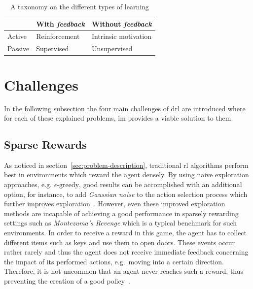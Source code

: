 \documentclass[draft,final]{vutinfth} %
\newcommand{\p}[1]{see p. #1}
\begin{document}
    \begin{table}
        \centering
        \begin{tabular}{|l|l|l|}
            \hline
            & With \textit{feedback} & Without \textit{feedback} \\
            \hline
            Active  & Reinforcement          & Intrinsic motivation      \\
            \hline
            Passive & Supervised             & Unsupervised              \\
            \hline
        \end{tabular}
        \caption[A taxonomy on the different types of learning]{A taxonomy on the different types of learning\protect\footnotemark}
        \label{tab:type_learning}
    \end{table}

    \footnotetext{\citep[\p{4}]{aubret_survey_2019}}


    \section{Challenges}

    In the following subsection the four main challenges of \gls{drl} are introduced where for each of these explained problems, \gls{im} provides a viable solution to them.

    \subsection{Sparse Rewards}\label{subsec:sparse-rewards}

    As noticed in section~\ref{sec:problem-description}, traditional \gls{rl} algorithms perform best in environments which reward the agent densely.
    By using naive exploration approaches, e.g. $\epsilon\text{-greedy}$, good results can be accomplished with an additional option, for instance, to add \textit{Gaussian noise} to the action selection process which further improves exploration~\citep{lillicrap_continuous_2019}.
    However, even these improved exploration methods are incapable of achieving a good performance in sparsely rewarding settings such as \textit{Montezuma's Revenge} which is a typical benchmark for such environments.
    In order to receive a reward in this game, the agent has to collect different items such as keys and use them to open doors.
    These events occur rather rarely and thus the agent does not receive immediate feedback concerning the impact of its performed actions, e.g.\ moving into a certain direction.
    Therefore, it is not uncommon that an agent never reaches such a reward, thus preventing the creation of a good policy~\citep{aubret_survey_2019}.
\end{document}
